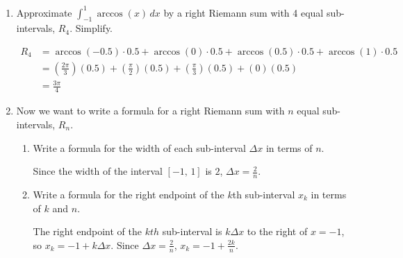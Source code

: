 \documentclass{article}
\begin{document}
\begin{enumerate}
\begin{enumerate}
    \begin{solution}
        See graph.
    \end{solution}

    \item 
    \begin{problem}
    Approximate $\displaystyle \int_{-1}^1 \arccos(x)\,dx$ by a right Riemann sum with 4 equal sub-intervals, $R_4$. Simplify.
    \end{problem}
    \pspace{\vfill}

    \begin{solution}
        \begin{align*}
            R_4 &= \arccos(-0.5)\cdot 0.5 + \arccos(0) \cdot 0.5 + \arccos(0.5) \cdot 0.5 + \arccos(1) \cdot 0.5 \\[4pt]
            &= (\tfrac{2\pi}{3})(0.5) + (\tfrac{\pi}{2})(0.5)+(\tfrac{\pi}{3})(0.5) + (0)(0.5) \\[4pt]
            &= \boxed{\tfrac{3\pi}{4}}
        \end{align*}
    \end{solution}

    \item
    \begin{problem}
    Now we want to write a formula for a right Riemann sum with $n$ equal sub-intervals, $R_n$.
    \end{problem}

    \begin{enumerate}
        \item 
        \begin{problem}
            Write a formula for the width of each sub-interval $\Delta x$ in terms of $n$.
        \end{problem}

        \begin{solution}
            Since the width of the interval $[-1,\,1]$ is $2$, $\boxed{\Delta x = \tfrac{2}{n}}$.
        \end{solution}

        \item
        \begin{problem}
            Write a formula for the right endpoint of the $k$th sub-interval $x_k$ in terms of $k$ and $n$.
        \end{problem}

        \begin{solution}
            The right endpoint of the $kth$ sub-interval is $k\Delta x$ to the right of $x=-1$, so $x_k=-1+k\Delta x$. Since $\Delta x = \tfrac{2}{n}$, $\boxed{x_k=-1+\tfrac{2k}{n}}$.
        \end{solution}


\end{enumerate}
\end{enumerate}
\end{enumerate}
\end{document}
